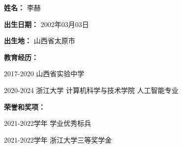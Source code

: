 \cleardoublepage
{}

\textbf{姓名：} 李赫

\textbf{出生日期：} 2002年03月03日

\textbf{出生地：} 山西省太原市

\textbf{教育经历：}

2017-2020 山西省实验中学

2020-2024 浙江大学 计算机科学与技术学院 人工智能专业

\textbf{荣誉和奖项：}

2021-2022学年 学业优秀标兵

2021-2022学年 浙江大学三等奖学金
